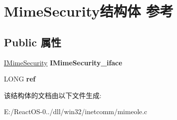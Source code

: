 \hypertarget{struct_mime_security}{}\section{Mime\+Security结构体 参考}
\label{struct_mime_security}
\subsection*{Public 属性}
\begin{DoxyCompactItemize}
\item 
\mbox{\label{struct_mime_security_ad17d420e3e9a116262cd9d8f97b670a6}} 
\hyperlink{class_i_mime_security}{I\+Mime\+Security} {\bfseries I\+Mime\+Security\+\_\+iface}
\item 
\mbox{\label{struct_mime_security_a269e9e5387d9e3a6b9fb485241c5cf25}} 
L\+O\+NG {\bfseries ref}
\end{DoxyCompactItemize}


该结构体的文档由以下文件生成\+:\begin{DoxyCompactItemize}
\item 
E\+:/\+React\+O\+S-\/0../dll/win32/inetcomm/mimeole.\+c\end{DoxyCompactItemize}
